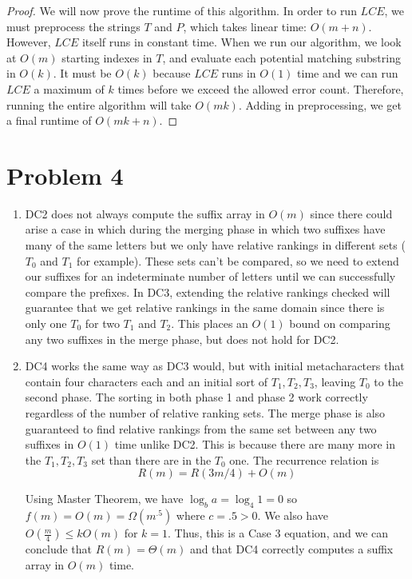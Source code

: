 \documentclass{article}
\theoremstyle{casestyle}
\begin{document}
\begin{proof}
We will now prove the runtime of this algorithm. In order to run $LCE$, we must preprocess the strings $T$ and $P$, which takes linear time: $O(m + n)$. However, $LCE$ itself runs in constant time. When we run our algorithm, we look at $O(m)$ starting indexes in $T$, and evaluate each potential matching substring in $O(k)$. It must be $O(k)$ because $LCE$ runs in $O(1)$ time and we can run $LCE$ a maximum of $k$ times before we exceed the allowed error count. Therefore, running the entire algorithm will take $O(mk)$. Adding in preprocessing, we get a final runtime of $O(mk + n)$.
\end{proof}

\section *{Problem 4}
\begin{enumerate}[i]
\item DC2 does not always compute the suffix array in $O(m)$ since there could arise a case in which during the merging phase in which two suffixes have many of the same letters but we only have relative rankings in different sets ($T_0$ and $T_1$ for example). These sets can't be compared, so we need to extend our suffixes for an indeterminate number of letters until we can successfully compare the prefixes. In DC3, extending the relative rankings checked will guarantee that we get relative rankings in the same domain since there is only one $T_0$ for two $T_1$ and $T_2$. This places an $O(1)$ bound on comparing any two suffixes in the merge phase, but does not hold for DC2.
\item DC4 works the same way as DC3 would, but with initial metacharacters that contain four characters each and an initial sort of $T_1, T_2, T_3$, leaving $T_0$ to the second phase. The sorting in both phase 1 and phase 2 work correctly regardless of the number of relative ranking sets. The merge phase is also guaranteed to find relative rankings from the same set between any two suffixes in $O(1)$ time unlike DC2. This is because there are many more in the $T_1, T_2, T_3$ set than there are in the $T_0$ one. The recurrence relation is \[
    R(m) = R(3m/4) + O(m)
\]

Using Master Theorem, we have $\log_b a = \log_4 1 = 0$ so $f(m) = O(m) = \Omega(m^{.5})$ where $c=.5 > 0$. We also have $O(\frac{m}{4}) \leq kO(m)$ for $k=1$. Thus, this is a Case 3 equation, and we can conclude that $R(m) = \Theta(m)$ and that DC4 correctly computes a suffix array in $O(m)$  time.
 
\end{enumerate}
\end{document}
